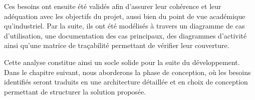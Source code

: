 Ces besoins ont ensuite été validés afin d’assurer leur cohérence et leur adéquation avec les objectifs du projet, aussi bien du point de vue académique qu’industriel. Par la suite, ils ont été modélisés à travers un diagramme de cas d’utilisation, une documentation des cas principaux, des diagrammes d’activité ainsi qu’une matrice de traçabilité permettant de vérifier leur couverture.

Cette analyse constitue ainsi un socle solide pour la suite du développement. Dans le chapitre suivant, nous aborderons la phase de conception, où les besoins identifiés seront traduits en une architecture détaillée et en choix de conception permettant de structurer la solution proposée.
